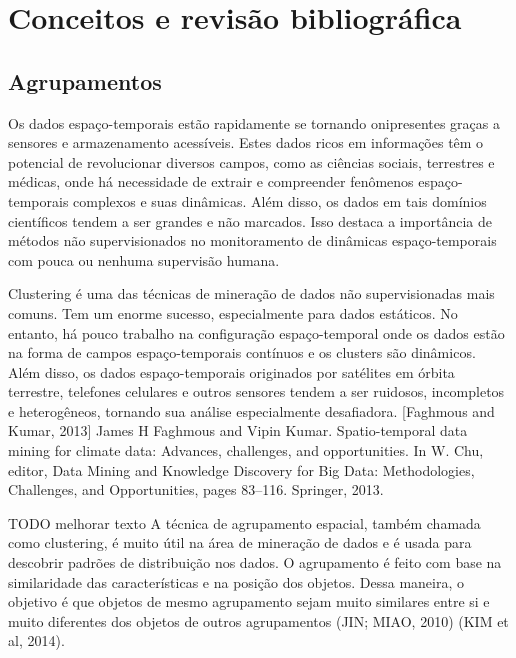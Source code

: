 \chapter{Conceitos e revisão bibliográfica}
\label{cap:estadodaarte}

\section{Agrupamentos}
Os dados espaço-temporais estão rapidamente se tornando onipresentes graças a sensores e armazenamento acessíveis. Estes dados ricos em informações têm o potencial de revolucionar diversos campos, como as ciências sociais, terrestres e médicas, onde há necessidade de extrair e compreender fenômenos espaço-temporais complexos e suas dinâmicas. Além disso, os dados em tais domínios científicos tendem a ser grandes e não marcados. Isso destaca a importância de métodos não supervisionados no monitoramento de dinâmicas espaço-temporais com pouca ou nenhuma supervisão humana.

Clustering é uma das técnicas de mineração de dados não supervisionadas mais comuns. Tem um enorme sucesso, especialmente para dados estáticos. No entanto, há pouco trabalho na configuração espaço-temporal onde os dados estão na forma de campos espaço-temporais contínuos e os clusters são dinâmicos. Além disso, os dados espaço-temporais originados por satélites em órbita terrestre, telefones celulares e outros sensores tendem a ser ruidosos, incompletos e heterogêneos, tornando sua análise especialmente desafiadora.
[Faghmous and Kumar, 2013]
James H Faghmous and Vipin
Kumar. Spatio-temporal data mining for climate data: Advances, challenges, and opportunities. In W. Chu, editor, Data Mining and Knowledge Discovery for Big Data: Methodologies, Challenges, and Opportunities, pages 83–116. Springer, 2013.

TODO melhorar texto
A técnica de agrupamento espacial, também chamada como clustering, é muito útil na
área de mineração de dados e é usada para descobrir padrões de distribuição nos dados. O
agrupamento é feito com base na similaridade das características e na posição dos objetos.
Dessa maneira, o objetivo é que objetos de mesmo agrupamento sejam muito similares entre
si e muito diferentes dos objetos de outros agrupamentos (JIN; MIAO, 2010) (KIM et al, 2014).


